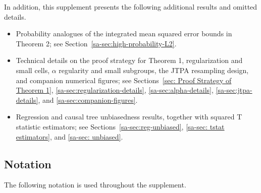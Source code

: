 \documentclass[10pt]{article}
\theoremstyle{definition}
\theoremstyle{remark}
\begin{document}
In addition, this supplement presents the following additional results and omitted details.
\begin{itemize}
    \item Probability analogues of the integrated mean squared error bounds in Theorem 2; see Section~\ref{sa-sec:high-probability-L2}.
    \item Technical details on the proof strategy for Theorem 1, regularization and small cells, $\alpha$ regularity and small subgroups, the JTPA resampling design, and companion numerical figures; see Sections~\ref{sec: Proof Strategy of Theorem 1}, \ref{sa-sec:regularization-details}, \ref{sa-sec:alpha-details}, \ref{sa-sec:jtpa-details}, and \ref{sa-sec:companion-figures}.
    \item Regression and causal tree unbiasedness results, together with squared T statistic estimators; see Sections~\ref{sa-sec:reg-unbiased}, \ref{sa-sec: tstat estimators}, and \ref{sa-sec: unbiased}.
\end{itemize}

\subsection{Notation}\label{sa-sec:notation}

The following notation is used throughout the supplement.
\end{document}
